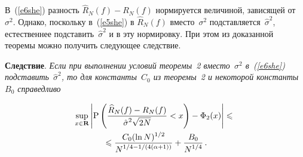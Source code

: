 \begin{multicols}{2}
В~(\ref{e6she}) разность $\widehat{R}_N(f)-R_N(f)$ нормируется величиной, зависящей от~$\sigma^2$. 
Однако, поскольку в~(\ref{e5she}) в $\widehat{R}_N(f)$ вместо~$\sigma^2$ подставляется~$\hat{\sigma}^2$, 
естественнее подставить~$\hat{\sigma}^2$ и в эту нормировку. При этом из доказанной теоремы можно получить 
следующее следствие.

\smallskip

\noindent
\textbf{Следствие}. \textit{Если при выполнении условий теоремы~2 вместо~$\sigma^2$ в~(\ref{e6she}) 
подставить~$\hat{\sigma}^2$, то для константы~$C_0$ из теоремы~2 и некоторой константы~$B_0$ справедливо}

\noindent
\begin{multline}
\sup\limits_{x\in\mathbf{R}}\left\vert\mbox{P}\left(\displaystyle\frac{\displaystyle \widehat{R}_N(f)-R_N(f)\mathstrut}{\displaystyle \hat{\sigma}^2\sqrt{2N}\mathstrut}<x\right)-
\Phi_2(x)\right\vert\leqslant{}\\
{}\leqslant \displaystyle\frac{\displaystyle C_0(\ln N)^{1/2}\mathstrut}{\displaystyle N^{1/4-1/(4(\alpha+1))}\mathstrut}+\displaystyle\frac{\displaystyle B_0\mathstrut}{\displaystyle N^{1/4}\mathstrut}\,.
\label{e20she}
\end{multline}

\medskip


\end{multicols}

